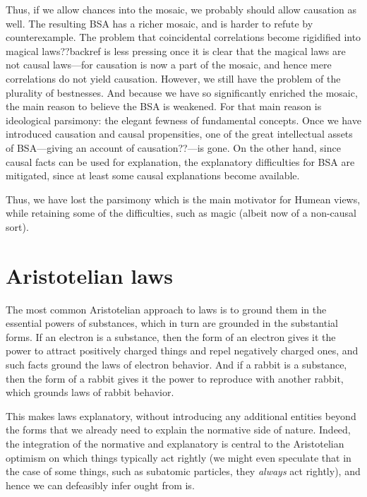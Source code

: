 Thus, if we allow chances into the mosaic, we probably should allow causation as well. The resulting BSA has a richer
mosaic, and is harder to refute by counterexample. The problem that coincidental correlations become rigidified into
magical laws??backref is less pressing once it is clear that the magical laws are not causal laws---for causation is 
now a part of the mosaic, and hence mere correlations do not yield causation. However, we still have the problem of 
the plurality of bestnesses. And because we have so significantly enriched the mosaic, the main reason to believe the
BSA is weakened. For that main reason is ideological parsimony: the elegant fewness of fundamental concepts. Once we 
have introduced causation and causal propensities, one of the great intellectual assets of BSA---giving
an account of causation??---is gone. On the other hand, since causal facts can be used for explanation, the explanatory difficulties for BSA are mitigated, since at least some causal explanations become available.

Thus, we have lost the parsimony which is the main motivator for Humean views, while retaining some of the 
difficulties, such as magic (albeit now of a non-causal sort).


\section{Aristotelian laws}
The most common Aristotelian approach to laws is to ground them in the essential powers of substances, which in turn are
grounded in the substantial forms. If an electron is a substance, then the form of an electron gives it the power to attract positively 
charged things and repel negatively charged ones, and such facts ground the laws of electron behavior. And if a rabbit is 
a substance, then the form of a rabbit gives it the power to reproduce with another rabbit, which grounds laws of rabbit
behavior. 

This makes laws explanatory, without introducing any additional entities beyond the forms that we already need to explain
the normative side of nature. Indeed, the integration of the normative and explanatory is central to the Aristotelian
optimism on which things typically act rightly (we might even speculate that in the case of some things, such as 
subatomic particles, they \textit{always} act rightly), and hence we can defeasibly infer ought from is.

